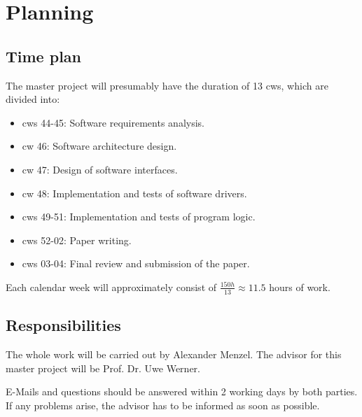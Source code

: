%
%

\chapter{Planning}
\label{chap:Planning}

\section{Time plan}
\label{sec:Time plan}
%
The master project will presumably have the duration of 13 \acp{cw}, which are divided into:

\begin{itemize}
    \item \acsp{cw} 44-45: Software requirements analysis.
    \item \acs{cw} 46: Software architecture design.
    \item \acs{cw} 47: Design of software interfaces.
    \item \acs{cw} 48: Implementation and tests of software drivers.
    \item \acsp{cw} 49-51: Implementation and tests of program logic.
    \item \acsp{cw} 52-02: Paper writing.
    \item \acsp{cw} 03-04: Final review and submission of the paper.
\end{itemize}

Each calendar week will approximately consist of $\frac{150\unit{h}}{13} \approx 11.5$ hours of work.

\section{Responsibilities}
\label{sec:Responsibilities}

The whole work will be carried out by Alexander Menzel. The advisor for this master project will be Prof. Dr. Uwe Werner.

E-Mails and questions should be answered within 2 working days by both parties. If any problems arise, the advisor has to be informed as soon as possible.